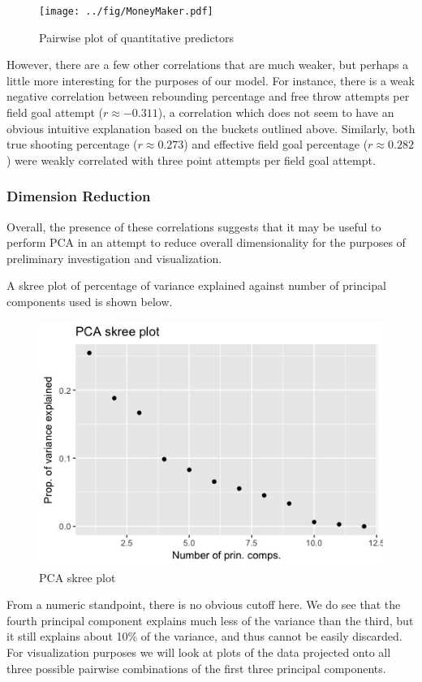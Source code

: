 \documentclass[10pt,a4paper, hidelinks]{article} %
\begin{document}
\begin{figure}[H]
	\centering
	\texttt{[image: ../fig/MoneyMaker.pdf]}
	\caption{Pairwise plot of quantitative predictors}
	\label{fig:ggpairs}
\end{figure} 

However, there are a few other correlations that are much weaker, but perhaps a little more interesting for the purposes of our model. For instance, there is a weak negative correlation between rebounding percentage and free throw attempts per field goal attempt ($r \approx -0.311$), a correlation which does not seem to have an obvious intuitive explanation based on the buckets outlined above. Similarly, both true shooting percentage ($r \approx 0.273$) and effective field goal percentage ($r \approx 0.282$) were weakly correlated with three point attempts per field goal attempt.

\subsubsection{Dimension Reduction}

Overall, the presence of these correlations suggests that it may be useful to perform PCA in an attempt to reduce overall dimensionality for the purposes of preliminary investigation and visualization.

A skree plot of percentage of variance explained against number of principal components used is shown below. 

\begin{figure}[H]
	\centering
	\includegraphics[width=0.6\linewidth]{../fig/Skreeeeee}
	\caption{PCA skree plot}
	\label{fig:Skreeeeee}
\end{figure}

From a numeric standpoint, there is no obvious cutoff here. We do see that the fourth principal component explains much less of the variance than the third, but it still explains about 10\% of the variance, and thus cannot be easily discarded. For visualization purposes we will look at plots of the data projected onto all three possible pairwise combinations of the first three principal components.
\end{document}
